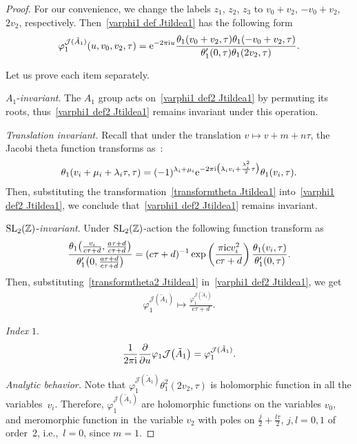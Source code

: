 \documentclass[pdftex]{sigma}%
\numberwithin{equation}{section}
\newcommand{\Ja}{\mathcal{J}}
\begin{document}
\begin{proof}
 For our convenience, we change the labels $z_1$, $z_2$, $z_3$ to $v_0+v_2$, $-v_0+v_2$, $2v_2$, respectively. Then~\eqref{varphi1 def Jtildea1} has the following form
\begin{gather}
\label{varphi1 def2 Jtildea1}
\varphi_1^{\Ja(\tilde A_1)}(u,v_0,v_2,\tau)={\rm e}^{-2\pi {\rm i} u}\frac{\theta_1(v_0+v_2,\tau)\theta_1(-v_0+v_2,\tau)}{\theta_1^{\prime}(0,\tau) \theta_1(2v_2,\tau)}.
\end{gather}

Let us prove each item separately.

 $A_1$-\emph{invariant}.
The $A_1$ group acts on~\eqref{varphi1 def2 Jtildea1} by permuting its roots, thus~\eqref{varphi1 def2 Jtildea1} remains invariant under this operation.

 \emph{Translation invariant.}
 Recall that under the translation $v\mapsto v+m+n\tau$, the Jacobi theta function transforms as~\cite{BertolaM.1, E.T.WhittakerandG.N.Watson}:
\begin{gather}\label{transformtheta Jtildea1}
\theta_1(v_i+\mu_i+\lambda_i\tau,\tau)=(-1)^{\lambda_i+\mu_i}{\rm e}^{-2\pi {\rm i}\big(\lambda_iv_i+\frac{\lambda_i^2}{2}\tau\big)}\theta_1(v_i,\tau).
\end{gather}
Then, substituting the transformation~\eqref{transformtheta Jtildea1} into~\eqref{varphi1 def2 Jtildea1}, we conclude that~\eqref{varphi1 def2 Jtildea1} remains inva\-riant.

 ${\rm SL}_2(\mathbb{Z})$-\emph{invariant}.
Under ${\rm SL}_2(\mathbb{Z})$-action the following function transform as
\begin{gather}
\label{transformtheta2 Jtildea1}
\frac{\theta_1\big(\frac{v_i}{c\tau+d},\frac{a\tau+d}{c\tau+d}\big)}
{\theta_1^{\prime}\big(0,\frac{a\tau+d}{c\tau+d}\big)}
=(c\tau+d)^{-1}\exp\left(\frac{\pi {\rm i} cv_i^2 }{c\tau+d}\right)\frac{\theta_1(v_i,\tau)}{\theta_1^{\prime}(0,\tau)}.
\end{gather}
Then, substituting~\eqref{transformtheta2 Jtildea1} in~\eqref{varphi1 def2 Jtildea1}, we get
\begin{gather*}
\varphi_1^{\Ja(\tilde A_1)}\mapsto \frac{\varphi_1^{\Ja(\tilde A_1)}}{c\tau+d}.
\end{gather*}

 \emph{Index} $1$.
\begin{gather*}
\frac{1}{2\pi {\rm i}}\frac{\partial}{\partial u}\varphi_1{\Ja\big(\tilde A_1\big)}=\varphi_1^{\Ja(\tilde A_1)}.
\end{gather*}

 \emph{Analytic behavior.}
Note that $\varphi_1^{\Ja(\tilde A_1)}\theta_1^2(2v_2,\tau)$ is holomorphic function in all the variables~$v_i$. Therefore, $\varphi_1^{\Ja(\tilde A_1)}$ are holomorphic functions on the variables $v_0$, and meromorphic function in~the variable $v_{2}$ with poles on $\frac{j}{2}+\frac{l\tau}{2}$, $j,l=0,1$ of order~2, i.e.,~$l=0$, since $m=1$.
\end{proof}
\end{document}
